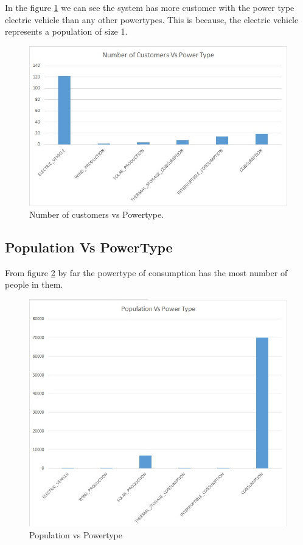 In the figure \ref{fig:cust-pt} we can see the system has more customer with the power type electric vehicle than any other powertypes. This is because, the electric vehicle represents a population of size 1.

\begin{figure}[h!]
  \includegraphics[width=\linewidth]{4-customer-vs-powertype.jpg}
  \caption{Number of customers vs Powertype.}
  \label{fig:cust-pt}
\end{figure}


\subsection {Population Vs PowerType}
From figure \ref{fig:pop-pt} by far the powertype of consumption has the most number of people in them.
\begin{figure}[h!]
  \includegraphics[width=\linewidth]{2-population-vs-powertype.jpg}
  \caption{Population vs Powertype}
  \label{fig:pop-pt}
\end{figure}


